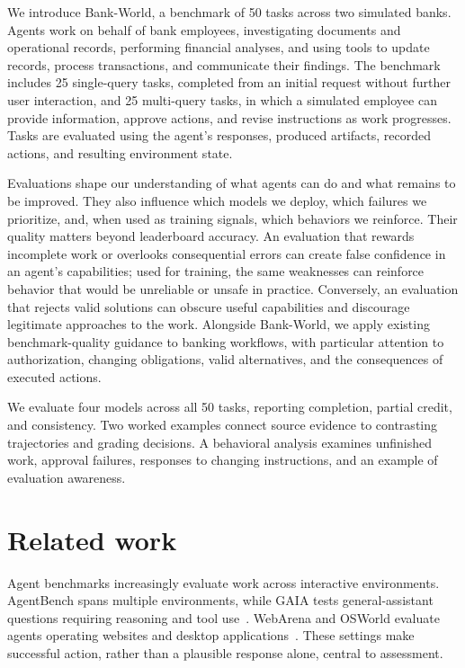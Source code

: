 \documentclass[11pt,letterpaper]{article}
\begin{document}
We introduce Bank-World, a benchmark of 50 tasks across two simulated banks. Agents work on behalf of bank employees, investigating documents and operational records, performing financial analyses, and using tools to update records, process transactions, and communicate their findings. The benchmark includes 25 single-query tasks, completed from an initial request without further user interaction, and 25 multi-query tasks, in which a simulated employee can provide information, approve actions, and revise instructions as work progresses. Tasks are evaluated using the agent's responses, produced artifacts, recorded actions, and resulting environment state.

Evaluations shape our understanding of what agents can do and what remains to be improved. They also influence which models we deploy, which failures we prioritize, and, when used as training signals, which behaviors we reinforce. Their quality matters beyond leaderboard accuracy. An evaluation that rewards incomplete work or overlooks consequential errors can create false confidence in an agent's capabilities; used for training, the same weaknesses can reinforce behavior that would be unreliable or unsafe in practice. Conversely, an evaluation that rejects valid solutions can obscure useful capabilities and discourage legitimate approaches to the work. Alongside Bank-World, we apply existing benchmark-quality guidance to banking workflows, with particular attention to authorization, changing obligations, valid alternatives, and the consequences of executed actions.

We evaluate four models across all 50 tasks, reporting completion, partial credit, and consistency. Two worked examples connect source evidence to contrasting trajectories and grading decisions. A behavioral analysis examines unfinished work, approval failures, responses to changing instructions, and an example of evaluation awareness.

\section{Related work}\label{sec:prior-work}
Agent benchmarks increasingly evaluate work across interactive environments. AgentBench spans multiple environments, while GAIA tests general-assistant questions requiring reasoning and tool use~\cite{agentbench,gaia}. WebArena and OSWorld evaluate agents operating websites and desktop applications~\cite{webarena,osworld}. These settings make successful action, rather than a plausible response alone, central to assessment.
\end{document}
